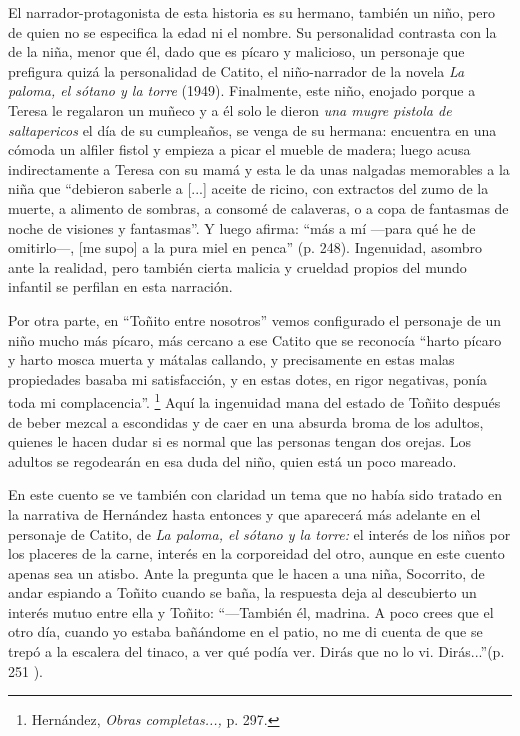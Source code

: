 \documentclass[14pt,twoside,final]{extbook} %
\let\oldfootnote\footnote
\renewcommand\footnote[1]{%
\oldfootnote{\hspace{1mm}#1}}
\begin{document}
El narrador-protagonista de esta historia es su hermano, también un niño, pero de quien no se especifica la edad ni el nombre. Su personalidad contrasta con la de la niña, menor que él, dado que es pícaro y malicioso, un personaje que prefigura quizá la personalidad de Catito, el niño-narrador de la novela \emph{La paloma, el sótano y la torre} (1949). Finalmente, este niño, enojado porque a Teresa le regalaron un muñeco y a él solo le dieron \emph{una mugre pistola de saltapericos} el día de su cumpleaños, se venga de su hermana: encuentra en una cómoda un alfiler fistol y empieza a picar el mueble de madera; luego acusa indirectamente a Teresa con su mamá y esta le da unas nalgadas memorables a la niña que ``debieron saberle a [...] aceite de ricino, con extractos del zumo de la muerte, a alimento de sombras, a consomé de calaveras, o a copa de fantasmas de noche de visiones y fantasmas''. Y luego afirma: ``más a mí ---para qué he de omitirlo---, [me supo] a la pura miel en penca'' (p. 248). Ingenuidad, asombro ante la realidad, pero también cierta malicia y crueldad propios del mundo infantil se perfilan en esta narración.

Por otra parte, en ``Toñito entre nosotros'' vemos configurado el personaje de un niño mucho más pícaro, más cercano a ese Catito que se reconocía ``harto pícaro y harto mosca muerta y mátalas callando, y precisamente en estas malas propiedades basaba mi satisfacción, y en estas dotes, en rigor negativas, ponía toda mi complacencia''.\footnote{Hernández, \emph{Obras completas...,} p. 297.} Aquí la ingenuidad mana del estado de Toñito después de beber mezcal a escondidas y de caer en una absurda broma de los adultos, quienes le hacen dudar si es normal que las personas tengan dos orejas. Los adultos se regodearán en esa duda del niño, quien está un poco mareado.

En este cuento se ve también con claridad un tema que no había sido tratado en la narrativa de Hernández hasta entonces y que aparecerá más adelante en el personaje de Catito, de \emph{La paloma, el sótano y la torre:} el interés de los niños por los placeres de la carne, interés en la corporeidad del otro, aunque en este cuento apenas sea un atisbo. Ante la pregunta que le hacen a una niña, Socorrito, de andar espiando a Toñito cuando se baña, la respuesta deja al descubierto un interés mutuo entre ella y Toñito: ``---También él, madrina. A poco crees que el otro día, cuando yo estaba bañándome en el patio, no me di cuenta de que se trepó a la escalera del tinaco, a ver qué podía ver. Dirás que no lo vi. Dirás...''(p. 251 ).
\end{document}
